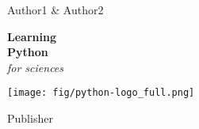 
\vspace*{\baselineskip} 

\centering  
{\Large Author1 \& Author2}
\vspace*{0.167\textheight} 

\raggedleft
\textbf{\fontsize{30}{36}\selectfont Learning}\\[\baselineskip] 
\textbf{\textcolor{pythonblue}{\fontsize{50}{60}\selectfont Python}}\\[\baselineskip]  
\textcolor{pythonyellow}{\fontsize{30}{36}\selectfont \textit{for sciences}}

\vspace*{0.1\textheight} 

\centering
\texttt{[image: fig/python-logo\_full.png]}

\vfill 

{\large Publisher} 